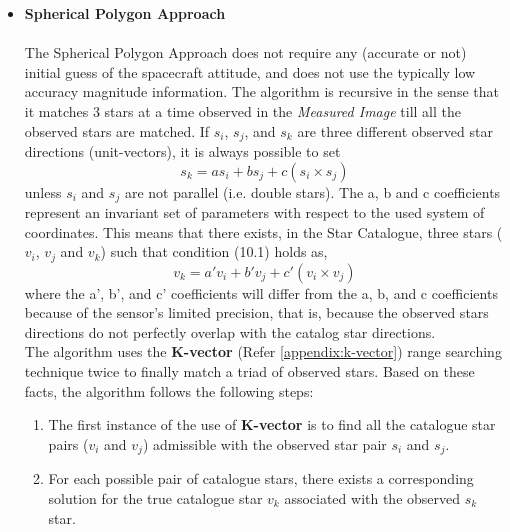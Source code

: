 \documentclass[../../main.tex]{subfiles}
\begin{document}
\begin{itemize}
    \item \textbf{Spherical Polygon Approach}\\
    \\
    The Spherical Polygon Approach does not require any (accurate or not) initial guess of the spacecraft attitude, and does not use the typically low accuracy magnitude information. The algorithm is recursive in the sense that it matches 3 stars at a time observed in the \textit{Measured Image} till all the observed stars are matched. 
   If \textit{$s_{i}$}, \textit{$s_{j}$}, and \textit{$s_{k}$} are three different observed star directions (unit-vectors), it is always possible to set
   \begin{equation}
        \textit{$s_{k}$} = a\textit{$s_{i}$} + b\textit{$s_{j}$} +c(\textit{$s_{i}$} \times \textit{$s_{j}$})
    \end{equation}
    unless \textit{$s_{i}$} and \textit{$s_{j}$} are not parallel (i.e. double stars). The a, b and c coefficients represent an invariant set of parameters with respect to the used system of coordinates. This means that there exists, in the Star Catalogue, three stars (\textit{$v_{i}$}, \textit{$v_{j}$} and \textit{$v_{k}$}) such that condition (10.1) holds as,  
    \begin{equation}                    
        \textit{$v_{k}$} = a'\textit{$v_{i}$} + b'\textit{$v_{j}$} +c'(\textit{$v_{i}$} \times \textit{$v_{j}$})
    \end{equation}
    where the a', b', and c' coefficients will differ from the a, b, and c coefficients because of the sensor’s limited precision, that is, because the observed stars directions do not perfectly overlap with the catalog star directions.\\
    The algorithm uses the \textbf{K-vector} (Refer \ref{appendix:k-vector}) range searching technique twice to finally match a triad of observed stars. Based on these facts, the algorithm follows the following steps:
    \begin{enumerate}                   
        \item The first instance of the use of \textbf{K-vector} is to find all the catalogue star pairs (\textit{$v_{i}$} and \textit{$v_{j}$}) admissible with the observed star pair \textit{$s_{i}$} and \textit{$s_{j}$}.
        \item For each possible pair of catalogue stars, there exists a corresponding solution for the true catalogue star \textit{$v_{k}$} associated with the observed \textit{$s_{k}$} star.

\end{enumerate}
\end{itemize}
\end{document}
